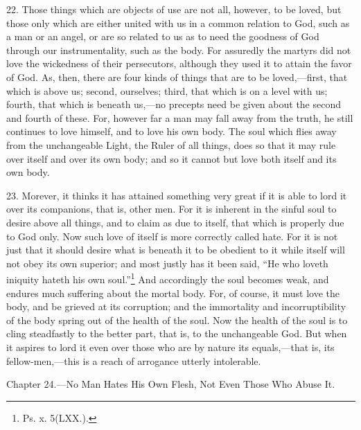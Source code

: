22. Those things which are objects of use are not all, however, to be loved, but those only which are either united with us in a common relation to God, such as a man or an angel, or are so related to us as to need the goodness of God through our instrumentality, such as the body. For assuredly the martyrs did not love the wickedness of their persecutors, although they used it to attain the favor of God. As, then, there are four kinds of things that are to be loved,—first, that which is above us; second, ourselves; third, that which is on a level with us; fourth, that which is beneath us,—no precepts need be given about the second and fourth of these. For, however far a man may fall away from the truth, he still continues to love himself, and to love his own body. The soul which flies away from the unchangeable Light, the Ruler of all things, does so that it may rule over itself and over its own body; and so it cannot but love both itself and its own body.

23. Morever, it thinks it has attained something very great if it is able to lord it over its companions, that is, other men. For it is inherent in the sinful soul to desire above all things, and to claim as due to itself, that which is properly due to God only. Now such love of itself is more correctly called hate. For it is not just that it should desire what is beneath it to be obedient to it while itself will not obey its own superior; and most justly has it been said, “He who loveth iniquity hateth his own soul.”\footnote{Ps. x. 5(LXX.).} And accordingly the soul becomes weak, and endures much suffering about the mortal body. For, of course, it must love the body, and be grieved at its corruption; and the immortality and incorruptibility of the body spring out of the health of the soul. Now the health of the soul is to cling steadfastly to the better part, that is, to the unchangeable God. But when it aspires to lord it even over those who are by nature its equals,—that is, its fellow-men,—this is a reach of arrogance utterly intolerable.


Chapter 24.—No Man Hates His Own Flesh, Not Even Those Who Abuse It.

